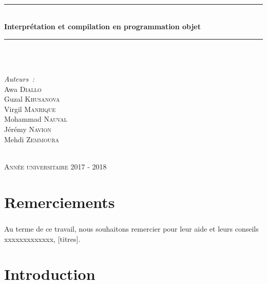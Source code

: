 \documentclass[a4paper,12pt]{report}
\newcommand{\HRule}{\rule{\linewidth}{0.5mm}}
\begin{document}
\begin{titlepage}
\begin{sffamily}
\begin{center}
   ~%
    \HRule\\
    { \huge \bfseries Interprétation et compilation en programmation objet\\ }

    \HRule \\[1.25cm]

   ~%
    \begin{minipage}{0.4\textwidth}
      \begin{flushleft} \large
				\emph{Auteurs~:}\\[0.5cm]
				Awa \textsc{Diallo}\\[0.2cm]
				Guzal \textsc{Khusanova}\\[0.2cm]
				Virgil \textsc{Manrique}\\[0.2cm]
				Mohammad \textsc{Nauval}\\[0.2cm]
				Jérémy \textsc{Navion}\\[0.2cm]
				Mehdi \textsc{Zemmoura}\\
      \end{flushleft}
    \end{minipage}\\[1.25cm]
		
		\textsc{\large Année universitaire 2017 - 2018}

  \end{center}
  \end{sffamily}
\end{titlepage}

\newpage
\tableofcontents

\chapter*{Remerciements}
\paragraph{}
Au terme de ce travail, nous souhaitons remercier pour leur aide et leurs conseils xxxxxxxxxxxxx, [titres].

\chapter*{Introduction}
\end{document}
